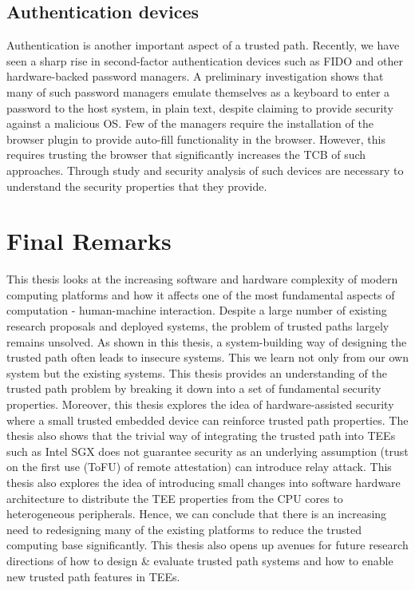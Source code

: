 \subsection{Authentication devices} Authentication is another important aspect of a trusted path. Recently, we have seen a sharp rise in second-factor authentication devices such as FIDO and other hardware-backed password managers. A preliminary investigation shows that many of such password managers emulate themselves as a keyboard to enter a password to the host system, in plain text, despite claiming to provide security against a malicious OS. Few of the managers require the installation of the browser plugin to provide auto-fill functionality in the browser. However, this requires trusting the browser that significantly increases the TCB of such approaches. Through study and security analysis of such devices are necessary to understand the security properties that they provide.



\section{Final Remarks}

This thesis looks at the increasing software and hardware complexity of modern computing platforms and how it affects one of the most fundamental aspects of computation - human-machine interaction. Despite a large number of existing research proposals and deployed systems, the problem of trusted paths largely remains unsolved. As shown in this thesis, a system-building way of designing the trusted path often leads to insecure systems. This we learn not only from our own system but the existing systems. This thesis provides an understanding of the trusted path problem by breaking it down into a set of fundamental security properties.
Moreover, this thesis explores the idea of hardware-assisted security where a small trusted embedded device can reinforce trusted path properties. The thesis also shows that the trivial way of integrating the trusted path into TEEs such as Intel SGX does not guarantee security as an underlying assumption (trust on the first use (ToFU) of remote attestation) can introduce relay attack. This thesis also explores the idea of introducing small changes into software hardware architecture to distribute the TEE properties from the CPU cores to heterogeneous peripherals. Hence, we can conclude that there is an increasing need to redesigning many of the existing platforms to reduce the trusted computing base significantly. This thesis also opens up avenues for future research directions of how to design \& evaluate trusted path systems and how to enable new trusted path features in TEEs.

